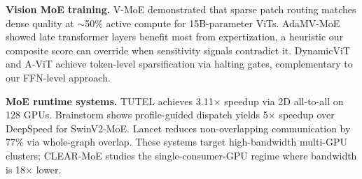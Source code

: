 \documentclass[conference]{IEEEtran}
\begin{document}
\begin{table}[!t]
\caption{Post-training MoE extraction: method comparison. $\dagger$ = MAC reduction (not wall-clock). $\ddagger$ = minimal fine-tuning reported by original paper. CLEAR-MoE: zero backbone weight updates.}
\label{tab:priorwork}
\centering
\small
\setlength{\tabcolsep}{2.5pt}
\end{table}

\textbf{Vision MoE training.} V-MoE \cite{riquelme2021vmoe} demonstrated that sparse patch routing matches dense quality at $\sim$50\% active compute for 15B-parameter ViTs. AdaMV-MoE \cite{chen2023adamvmoe} showed late transformer layers benefit most from expertization, a heuristic our composite score can override when sensitivity signals contradict it. DynamicViT \cite{rao2021dynamicvit} and A-ViT \cite{yin2022avit} achieve token-level sparsification via halting gates, complementary to our FFN-level approach.

\textbf{MoE runtime systems.} TUTEL \cite{hwang2023tutel} achieves 3.11$\times$ speedup via 2D all-to-all on 128 GPUs. Brainstorm \cite{brainstorm2023} shows profile-guided dispatch yields 5$\times$ speedup over DeepSpeed for SwinV2-MoE. Lancet \cite{lancet2024} reduces non-overlapping communication by 77\% via whole-graph overlap. These systems target high-bandwidth multi-GPU clusters; CLEAR-MoE studies the single-consumer-GPU regime where bandwidth is 18$\times$ lower.
\end{document}
